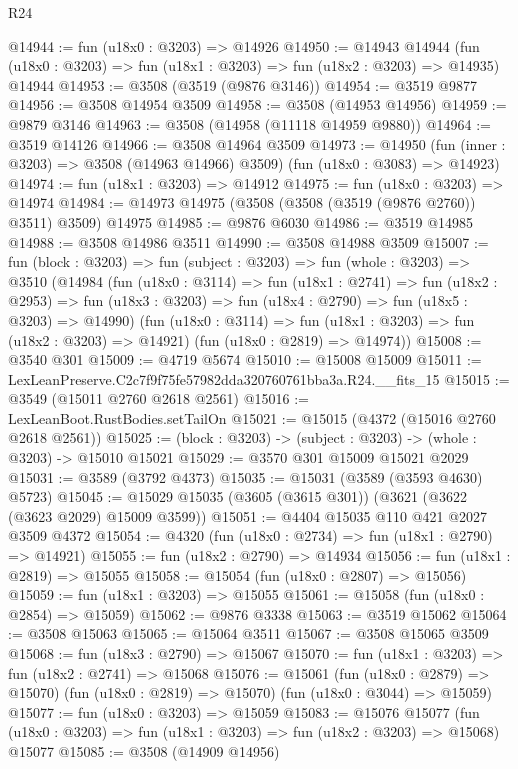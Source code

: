 \begin{lexlean}{R24}
\begin{coremodule}
@14944 := fun (u18x0 : @3203) => @14926
@14950 := @14943
    @14944
    (fun (u18x0 : @3203) => fun (u18x1 : @3203) => fun (u18x2 : @3203) => @14935)
    @14944
@14953 := @3508 (@3519 (@9876 @3146))
@14954 := @3519 @9877
@14956 := @3508 @14954 @3509
@14958 := @3508 (@14953 @14956)
@14959 := @9879 @3146
@14963 := @3508 (@14958 (@11118 @14959 @9880))
@14964 := @3519 @14126
@14966 := @3508 @14964 @3509
@14973 := @14950
    (fun (inner : @3203) => @3508 (@14963 @14966) @3509)
    (fun (u18x0 : @3083) => @14923)
@14974 := fun (u18x1 : @3203) => @14912
@14975 := fun (u18x0 : @3203) => @14974
@14984 := @14973 @14975 (@3508 (@3508 (@3519 (@9876 @2760)) @3511) @3509) @14975
@14985 := @9876 @6030
@14986 := @3519 @14985
@14988 := @3508 @14986 @3511
@14990 := @3508 @14988 @3509
@15007 := fun (block : @3203) =>
  fun (subject : @3203) =>
  fun (whole : @3203) =>
  @3510
    (@14984
      (fun (u18x0 : @3114) =>
      fun (u18x1 : @2741) =>
      fun (u18x2 : @2953) =>
      fun (u18x3 : @3203) => fun (u18x4 : @2790) => fun (u18x5 : @3203) => @14990)
      (fun (u18x0 : @3114) => fun (u18x1 : @3203) => fun (u18x2 : @3203) => @14921)
      (fun (u18x0 : @2819) => @14974))
@15008 := @3540 @301
@15009 := @4719 @5674
@15010 := @15008 @15009
@15011 := LexLeanPreserve.C2c7f9f75fe57982dda320760761bba3a.R24.__fits_15
@15015 := @3549 (@15011 @2760 @2618 @2561)
@15016 := LexLeanBoot.RustBodies.setTailOn
@15021 := @15015 (@4372 (@15016 @2760 @2618 @2561))
@15025 := (block : @3203) -> (subject : @3203) -> (whole : @3203) -> @15010 @15021
@15029 := @3570 @301 @15009 @15021 @2029
@15031 := @3589 (@3792 @4373)
@15035 := @15031 (@3589 (@3593 @4630) @5723)
@15045 := @15029 @15035 (@3605 (@3615 @301)) (@3621 (@3622 (@3623 @2029) @15009 @3599))
@15051 := @4404 @15035 @110 @421 @2027 @3509 @4372
@15054 := @4320 (fun (u18x0 : @2734) => fun (u18x1 : @2790) => @14921)
@15055 := fun (u18x2 : @2790) => @14934
@15056 := fun (u18x1 : @2819) => @15055
@15058 := @15054 (fun (u18x0 : @2807) => @15056)
@15059 := fun (u18x1 : @3203) => @15055
@15061 := @15058 (fun (u18x0 : @2854) => @15059)
@15062 := @9876 @3338
@15063 := @3519 @15062
@15064 := @3508 @15063
@15065 := @15064 @3511
@15067 := @3508 @15065 @3509
@15068 := fun (u18x3 : @2790) => @15067
@15070 := fun (u18x1 : @3203) => fun (u18x2 : @2741) => @15068
@15076 := @15061
    (fun (u18x0 : @2879) => @15070)
    (fun (u18x0 : @2819) => @15070)
    (fun (u18x0 : @3044) => @15059)
@15077 := fun (u18x0 : @3203) => @15059
@15083 := @15076
    @15077
    (fun (u18x0 : @3203) => fun (u18x1 : @3203) => fun (u18x2 : @3203) => @15068)
    @15077
@15085 := @3508 (@14909 @14956)

\end{coremodule}
\end{lexlean}
